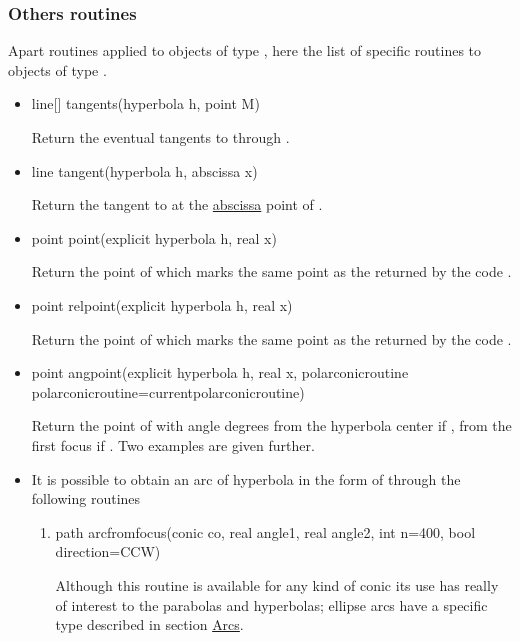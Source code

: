 \documentclass[pdftex]{article}
\begin{document}
\subsubsection{Others routines}
Apart routines applied to objects of type , here the list
of specific routines to objects of type .
\begin{itemize}
\item {}
  \begin{Vcolor}
    line[] tangents(hyperbola h, point M)
  \end{Vcolor}
  Return the eventual tangents to  through .
\item {}
  \begin{Vcolor}
    line tangent(hyperbola h, abscissa x)
  \end{Vcolor}
    Return the tangent to  at the 
    \href{#section.abscissa}{abscissa} point of .
\item {}
  \begin{Vcolor}
    point point(explicit hyperbola h, real x)
  \end{Vcolor}
    Return the point of  which marks the same point as the
   returned by the code .
\item {}
  \begin{Vcolor}
    point relpoint(explicit hyperbola h, real x)
  \end{Vcolor}
  Return the point of  which marks the same point as the
   returned by the code .
\item {}
  \begin{Vcolor}
    point angpoint(explicit hyperbola h, real x,
    polarconicroutine polarconicroutine=currentpolarconicroutine)
  \end{Vcolor}
  Return the point of  with angle  degrees from the
  hyperbola center \linebreak
  if , from the first focus if
  . Two examples are given further.
\item It is possible to obtain an arc of hyperbola in the form of
   through the following routines
  \begin{enumerate}
  \item
    \begin{Vcolor}
      path arcfromfocus(conic co, real angle1, real angle2, int n=400, bool direction=CCW)
    \end{Vcolor}
    Although this routine is available for any kind of conic its use has
    really of interest to the parabolas and hyperbolas; ellipse arcs have a
    specific type described in section \href{#section.arc}{Arcs}.


\end{enumerate}
\end{itemize}
\end{document}
